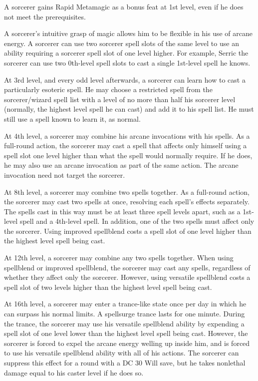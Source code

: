  A sorcerer gains Rapid Metamagic as a bonus feat at 1st level, even if he does not meet the prerequisites.

 A sorcerer's intuitive grasp of magic allows him to be flexible in his use of arcane energy. A sorcerer can use two sorcerer spell slots of the same level to use an ability requiring a sorcerer spell slot of one level higher. For example, Serric the sorcerer can use two 0th-level spell slots to cast a single 1st-level spell he knows.

 At 3rd level, and every odd level afterwards, a sorcerer can learn how to cast a particularly esoteric spell. He may choose a restricted spell from the sorcerer/wizard spell list with a level of no more than half his sorcerer level (normally, the highest level spell he can cast) and add it to his spell list. He must still use a spell known to learn it, as normal.

 At 4th level, a sorcerer may combine his arcane invocations with his spells. As a full-round action, the sorcerer may cast a spell that affects only himself using a spell slot one level higher than what the spell would normally require. If he does, he may also use an arcane invocation as part of the same action. The arcane invocation need not target the sorcerer.

 At 8th level, a sorcerer may combine two spells together. As a full-round action, the sorcerer may cast two spells at once, resolving each spell's effects separately. The spells cast in this way must be at least three spell levels apart, such as a 1st-level spell and a 4th-level spell. In addition, one of the two spells must affect only the sorcerer. Using improved spellblend costs a spell slot of one level higher than the highest level spell being cast.

 At 12th level, a sorcerer may combine any two spells together. When using spellblend or improved spellblend, the sorcerer may cast any spells, regardless of whether they affect only the sorcerer. However, using versatile spellblend costs a spell slot of two levels higher than the highest level spell being cast.

 At 16th level, a sorcerer may enter a trance-like state once per day in which he can surpass his normal limits. A spellsurge trance lasts for one minute. During the trance, the sorcerer may use his versatile spellblend ability by expending a spell slot of one level lower than the highest level spell being cast. However, the sorcerer is forced to expel the arcane energy welling up inside him, and is forced to use his versatile spellblend ability with all of his actions. The sorcerer can suppress this effect for a round with a DC 30 Will save, but he takes nonlethal damage equal to his caster level if he does so. %

